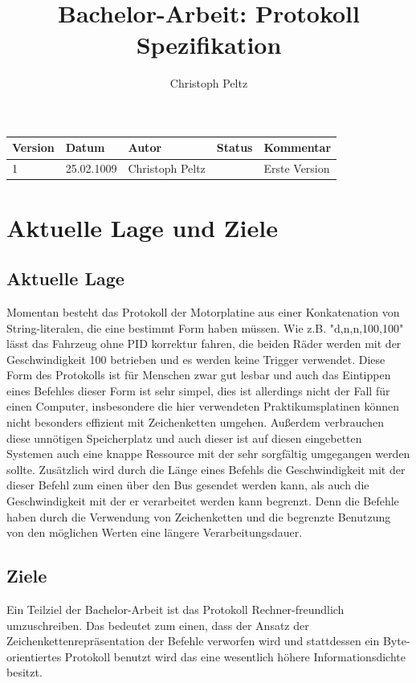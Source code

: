 \documentclass[a4paper]{article}
\title{Bachelor-Arbeit: Protokoll Spezifikation}
\author{Christoph Peltz}
\begin{document}
\maketitle
\tableofcontents
	\begin{tabularx}{\linewidth}{|l|l|l|l|X|}
		\hline
		\textbf{Version} & \textbf{Datum} & \textbf{Autor} 	& \textbf{Status} & \textbf{Kommentar} \\
		\hline
		\hline
		1 				 & 25.02.1009 	  & Christoph Peltz & 				  & Erste Version \\
		\hline
	\end{tabularx}

\pagebreak
	\section{Aktuelle Lage und Ziele}

	\subsection{Aktuelle Lage}

	Momentan besteht das Protokoll der Motorplatine aus einer Konkatenation von String-literalen, die eine bestimmt Form haben müssen.
	Wie z.B. "d,n,n,100,100" lässt das Fahrzeug ohne PID korrektur fahren, die beiden Räder werden mit der Geschwindigkeit 100
	betrieben und es werden keine Trigger verwendet. Diese Form des Protokolls ist für Menschen zwar gut lesbar und auch das Eintippen
	eines Befehles dieser Form ist sehr simpel, dies ist allerdings nicht der Fall für einen Computer, insbesondere die hier
	verwendeten Praktikumsplatinen können nicht besonders effizient mit Zeichenketten umgehen. Außerdem verbrauchen diese unnötigen
	Speicherplatz und auch dieser ist auf diesen eingebetten Systemen auch eine knappe Ressource mit der sehr sorgfältig umgegangen
	werden sollte. Zusätzlich wird durch die Länge eines Befehls die Geschwindigkeit mit der dieser Befehl zum einen über den Bus
	gesendet werden kann, als auch die Geschwindigkeit mit der er verarbeitet werden kann begrenzt. Denn die Befehle haben durch
	die Verwendung von Zeichenketten und die begrenzte Benutzung von den möglichen Werten eine längere Verarbeitungsdauer.

	\subsection{Ziele}

	Ein Teilziel der Bachelor-Arbeit ist das Protokoll Rechner-freundlich umzuschreiben. Das bedeutet zum einen, dass der Ansatz der
	Zeichenkettenrepräsentation der Befehle verworfen wird und stattdessen ein Byte-orientiertes Protokoll benutzt wird das eine
	wesentlich höhere Informationsdichte besitzt.
\end{document}
